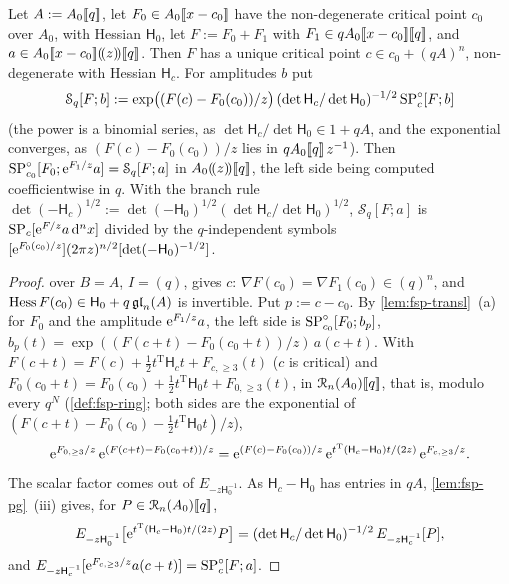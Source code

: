 \begin{cor}
\label{cor:fsp-movebase}
Let $A:=A_0[\![ q ]\!]$, let $F_0\in A_0[\![ x-c_0 ]\!]$ have the non-degenerate critical point $c_0$ over $A_0$, with Hessian $\mathsf H_0$, let $F:=F_0+F_1$ with $F_1\in qA_0[\![ x-c_0 ]\!][\![ q ]\!]$, and $a\in A_0[\![ x-c_0 ]\!](\!(z)\!)[\![ q ]\!]$. Then $F$ has a unique critical point $c\in c_0+(qA)^n$, non-degenerate with Hessian $\mathsf H_c$. For amplitudes $b$ put
\[
\mathcal S_q[F;b]:=\exp\bigl((F(c)-F_0(c_0))/z\bigr)\,(\det\mathsf H_c/\det\mathsf H_0)^{-1/2}\,\mathrm{SP}^{\circ}_c[F;b]
\]
(the power is a binomial series, as $\det\mathsf H_c/\det\mathsf H_0\in1+qA$, and the exponential converges, as $(F(c)-F_0(c_0))/z$ lies in $qA_0[\![ q ]\!]\,z^{-1}$). Then $\mathrm{SP}^{\circ}_{c_0}[F_0;\mathrm{e}^{F_1/z}a]=\mathcal S_q[F;a]$ in $A_0(\!(z)\!)[\![ q ]\!]$, the left side being computed coefficientwise in $q$. With the branch rule $\det(-\mathsf H_c)^{1/2}:=\det(-\mathsf H_0)^{1/2}(\det\mathsf H_c/\det\mathsf H_0)^{1/2}$, $\mathcal S_q[F;a]$ is $\mathrm{SP}_c[\mathrm{e}^{F/z}a\,\mathrm{d}^nx]$ divided by the $q$-independent symbols $[\mathrm{e}^{F_0(c_0)/z}](2\pi z)^{n/2}[\det(-\mathsf H_0)^{-1/2}]$.
\end{cor}

\begin{proof}
 over $B=A$, $I=(q)$, gives $c$: $\nabla F(c_0)=\nabla F_1(c_0)\in(q)^n$, and $\operatorname{Hess} F(c_0)\in\mathsf H_0+q\,\mathfrak{gl}_n(A)$ is invertible. Put $p:=c-c_0$. By \cref{lem:fsp-transl}~(a) for $F_0$ and the amplitude $\mathrm{e}^{F_1/z}a$, the left side is $\mathrm{SP}^{\circ}_{c_0}[F_0;b_p]$, $b_p(t)=\exp((F(c+t)-F_0(c_0+t))/z)\,a(c+t)$. With $F(c+t)=F(c)+\frac12t^{\mathrm T}\mathsf H_ct+F_{c,\geq3}(t)$ ($c$ is critical) and $F_0(c_0+t)=F_0(c_0)+\frac12t^{\mathrm T}\mathsf H_0t+F_{0,\geq3}(t)$, in $\mathcal{R}_n(A_0)[\![ q ]\!]$, that is, modulo every $q^N$ (\cref{def:fsp-ring}; both sides are the exponential of $(F(c+t)-F_0(c_0)-\frac12t^{\mathrm T}\mathsf H_0t)/z$),
\[
\mathrm{e}^{F_{0,\geq3}/z}\,\mathrm{e}^{(F(c+t)-F_0(c_0+t))/z}=\mathrm{e}^{(F(c)-F_0(c_0))/z}\,\mathrm{e}^{t^{\mathrm T}(\mathsf H_c-\mathsf H_0)t/(2z)}\,\mathrm{e}^{F_{c,\geq3}/z}.
\]
The scalar factor comes out of $E_{-z\mathsf H_0^{-1}}$. As $\mathsf H_c-\mathsf H_0$ has entries in $qA$, \cref{lem:fsp-pg}~(iii) gives, for $P\in\mathcal{R}_n(A_0)[\![ q ]\!]$,
\[
E_{-z\mathsf H_0^{-1}}\bigl[\mathrm{e}^{t^{\mathrm T}(\mathsf H_c-\mathsf H_0)t/(2z)}P\bigr]=(\det\mathsf H_c/\det\mathsf H_0)^{-1/2}\,E_{-z\mathsf H_c^{-1}}[P],
\]
and $E_{-z\mathsf H_c^{-1}}[\mathrm{e}^{F_{c,\geq3}/z}a(c+t)]=\mathrm{SP}^{\circ}_c[F;a]$.
\end{proof}

